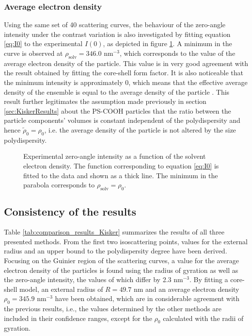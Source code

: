 \subsubsection{Average electron density}
Using the same set of 40 scattering curves, the behaviour of the zero-angle intensity under the contrast variation is also investigated by fitting equation \eqref{eq:I0} to the experimental \(I(0)\), as depicted in figure \ref{fig:KiskerIntensityParabola}. A minimum in the curve is observed at \(\rho_{\text{solv}}=346.0\) nm\(^{-3}\), which corresponds to the value of the average electron density of the particle. This value is in very good agreement with the result obtained by fitting the core-shell form factor. It is also noticeable that the minimum intensity is approximately 0, which means that the effective average density of the ensemble is equal to the average density of the particle \citep{avdeev_contrast_2007}. This result further legitimates the assumption made previously in section \ref{sec:KiskerResults} about the PS-COOH particles that the ratio between the particle components' volumes is constant independent of the polydispersity and hence \(  \tilde \rho_0 = \rho_0  \), i.e. the average density of the particle is not altered by the size polydispersity.

\begin{figure}%
	\centering
		
		\caption[Zero-angle intensity of the PS-COOH particles.]{Experimental zero-angle intensity as a function of the solvent electron density. The function corresponding to equation \eqref{eq:I0} is fitted to the data and shown as a thick line. The minimum in the parabola corresponds to $\rho_{\text{solv}}=\rho_0$.}
		\label{fig:KiskerIntensityParabola}
\end{figure}

\subsection{Consistency of the results}
Table \ref{tab:comparison_results_Kisker} summarizes the results of all three presented methods. From the first two isoscattering points, values for the external radius and an upper bound to the polydispersity degree have been derived. Focusing on the Guinier region of the scattering curves, a value for the average electron density of the particles is found using the radius of gyration as well as the zero-angle intensity, the values of which differ by 2.3 nm\(^{-3}\). By fitting a core-shell model, an external radius of \(R=49.7\) nm and an average electron density \(\rho_0=345.9\) nm\(^{-3}\) have been obtained, which are in considerable agreement with the previous results, i.e., the values determined by the other methods are included in their confidence ranges, except for the \(\rho_0\) calculated with the radii of gyration.

